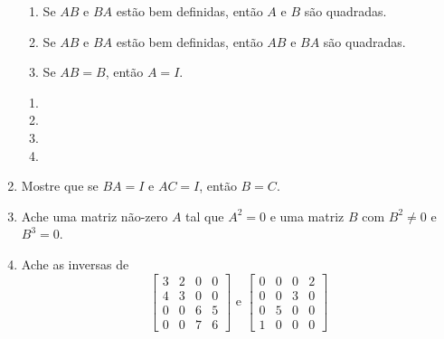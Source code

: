 \documentclass[leqno]{article}
\begin{document}
\begin{enumerate}
\begin{enumerate}
\item Se $AB$ e $BA$ estão bem definidas, então $A$ e $B$ são quadradas.

\item Se $AB$ e $BA$ estão bem definidas, então $AB$ e $BA$ são quadradas.

\item Se $AB = B$, então $A = I$.

\end{enumerate}

\begin{sol} 
	\begin{enumerate} 
		\item %

		\item %

		\item %

		\item %
	\end{enumerate} 
\end{sol} 

\item Mostre que se $BA = I$ e $AC = I$, então $B=C$.

\begin{sol} 
\end{sol} 

\item Ache uma matriz não-zero $A$ tal que $A^2 = 0$ e uma matriz $B$ com $B^2 \neq 0$ e $B^3 = 0$.

\begin{sol} 
\end{sol} 

\item Ache as inversas de 
$$\begin{bmatrix} 
3 & 2 & 0 & 0 \\
4 & 3 & 0 & 0 \\
0 & 0 & 6 & 5 \\
0 & 0 & 7 & 6
\end{bmatrix} \mbox{ e } 
\begin{bmatrix} 
0 & 0 & 0 & 2 \\
0 & 0 & 3 & 0 \\
0 & 5 & 0 & 0 \\
1 & 0 & 0 & 0
\end{bmatrix}$$

\begin{sol} 
\end{sol} 


\end{enumerate}
\end{document}
